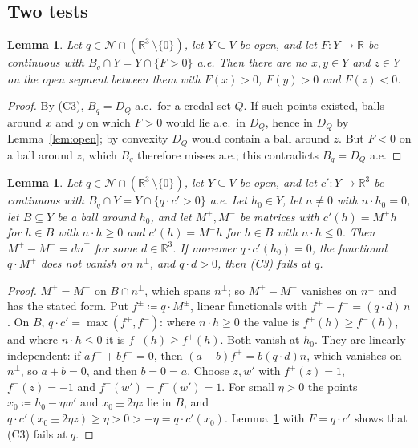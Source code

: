 \documentclass[11pt]{article}
\newcommand{\R}{\mathbb{R}}
\theoremstyle{plain}
\newtheorem{lemma}[theorem]{Lemma}
\theoremstyle{definition}
\theoremstyle{remark}
\begin{document}
\subsection*{Two tests}

\begin{lemma}\label{lem:convtest}
Let $q\in\mathcal N\cap(\R^3_+\setminus\{0\})$, let $Y\subseteq V$ be open, and let
$F:Y\to\R$ be continuous with $B_q\cap Y=Y\cap\{F>0\}$ a.e. Then there are no $x,y\in Y$
and $z\in Y$ on the open segment between them with $F(x)>0$, $F(y)>0$ and $F(z)<0$.
\end{lemma}

\begin{proof}
By (C3), $B_q=D_Q$ a.e.\ for a credal set $Q$. If such points existed, balls around $x$
and $y$ on which $F>0$ would lie a.e.\ in $D_Q$, hence in $D_Q$ by Lemma~\ref{lem:open};
by convexity $D_Q$ would contain a ball around $z$. But $F<0$ on a ball around $z$, which
$B_q$ therefore misses a.e.; this contradicts $B_q=D_Q$ a.e.
\end{proof}

\begin{lemma}\label{lem:kinktest}
Let $q\in\mathcal N\cap(\R^3_+\setminus\{0\})$, let $Y\subseteq V$ be open, and let
$c':Y\to\R^3$ be continuous with $B_q\cap Y=Y\cap\{q\cdot c'>0\}$ a.e. Let $h_0\in Y$, let
$n\ne0$ with $n\cdot h_0=0$, let $B\subseteq Y$ be a ball around $h_0$, and let $M^+,M^-$ be
matrices with $c'(h)=M^+h$ for $h\in B$ with $n\cdot h\ge0$ and $c'(h)=M^-h$ for $h\in B$
with $n\cdot h\le0$. Then $M^+-M^-=dn^\top$ for some $d\in\R^3$. If moreover $q\cdot
c'(h_0)=0$, the functional $q\cdot M^+$ does not vanish on $n^\perp$, and $q\cdot d>0$,
then (C3) fails at $q$.
\end{lemma}

\begin{proof}
$M^+=M^-$ on $B\cap n^\perp$, which spans $n^\perp$; so $M^+-M^-$ vanishes on $n^\perp$ and
has the stated form. Put $f^\pm\coloneqq q\cdot M^\pm$, linear functionals with
$f^+-f^-=(q\cdot d)\,n$. On $B$, $q\cdot c'=\max(f^+,f^-)$: where $n\cdot h\ge0$ the value
is $f^+(h)\ge f^-(h)$, and where $n\cdot h\le0$ it is $f^-(h)\ge f^+(h)$. Both vanish at
$h_0$. They are linearly independent: if $af^++bf^-=0$, then $(a+b)f^+=b(q\cdot d)n$, which
vanishes on $n^\perp$, so $a+b=0$, and then $b=0=a$. Choose $z,w'$ with $f^+(z)=1$,
$f^-(z)=-1$ and $f^+(w')=f^-(w')=1$. For small $\eta>0$ the points $x_0\coloneqq
h_0-\eta w'$ and $x_0\pm2\eta z$ lie in $B$, and $q\cdot c'(x_0\pm2\eta z)\ge\eta>0>
-\eta=q\cdot c'(x_0)$. Lemma~\ref{lem:convtest} with $F=q\cdot c'$ shows that (C3) fails
at $q$.
\end{proof}
\end{document}
